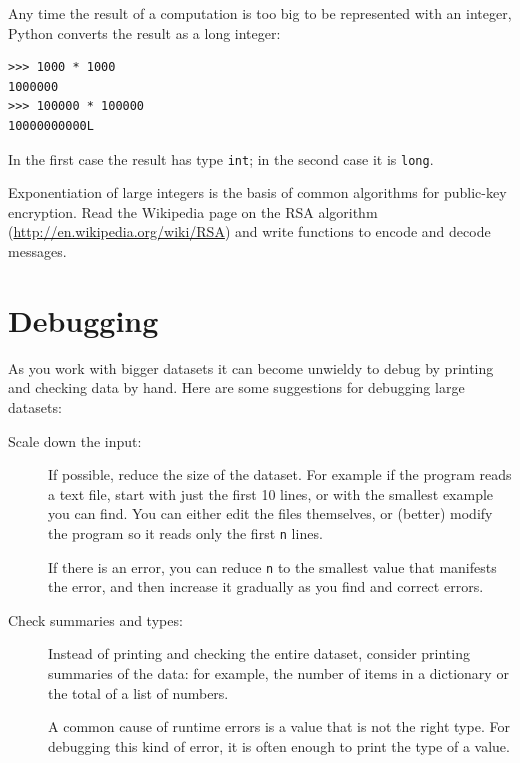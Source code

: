 \documentclass[10pt]{book}
\begin{document}
\begin{CJK}{UTF8}{gbsn}
Any time the result of a computation is too big to be represented with
an integer, Python converts the result as a long integer:

\begin{verbatim}
>>> 1000 * 1000
1000000
>>> 100000 * 100000
10000000000L
\end{verbatim}
%
In the first case the result has type {\tt int}; in the
second case it is {\tt long}.

\begin{exercise}

Exponentiation of large integers is the basis of common
algorithms for public-key encryption.  Read the Wikipedia
page on the RSA algorithm (\url{http://en.wikipedia.org/wiki/RSA})
and write functions to encode and decode messages.


\end{exercise}


\section{Debugging}

As you work with bigger datasets it can become unwieldy to
debug by printing and checking data by hand.  Here are some
suggestions for debugging large datasets:

\begin{description}

\item[Scale down the input:] If possible, reduce the size of the
dataset.  For example if the program reads a text file, start with
just the first 10 lines, or with the smallest example you can find.
You can either edit the files themselves, or (better) modify the
program so it reads only the first {\tt n} lines.

If there is an error, you can reduce {\tt n} to the smallest
value that manifests the error, and then increase it gradually
as you find and correct errors.

\item[Check summaries and types:] Instead of printing and checking the
entire dataset, consider printing summaries of the data: for example,
the number of items in a dictionary or the total of a list of numbers.

A common cause of runtime errors is a value that is not the right
type.  For debugging this kind of error, it is often enough to print
the type of a value.


\end{description}
\end{CJK}
\end{document}
